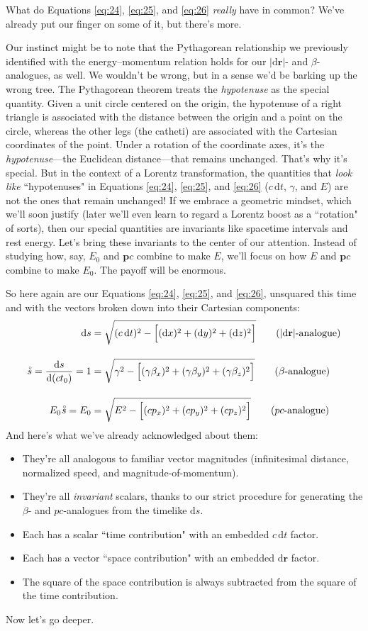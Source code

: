 \documentclass[12pt]{article}
\renewcommand{\mathring}[1]{\accentset{\circ}{#1}}
\renewcommand{\vv}[1]{\mathbf{#1}}
\newcommand{\dd}[1]{\mathrm{d}#1}
\begin{document}
What do Equations \ref{eq:24}, \ref{eq:25}, and \ref{eq:26} \emph{really} have in common? We've already put our finger on some of it, but there's more.

Our instinct might be to note that the Pythagorean relationship we previously identified with the energy--momentum relation holds for our $\vert \dd \vv r \vert$- and $\beta$-analogues, as well. We wouldn't be wrong, but in a sense we'd be barking up the wrong tree. The Pythagorean theorem treats the \emph{hypotenuse} as the special quantity. Given a unit circle centered on the origin, the hypotenuse of a right triangle is associated with the distance between the origin and a point on the circle, whereas the other legs (the catheti) are associated with the Cartesian coordinates of the point. Under a rotation of the coordinate axes, it's the \emph{hypotenuse}---the Euclidean distance---that remains unchanged. That's why it's special. But in the context of a Lorentz transformation, the quantities that \emph{look like} ``hypotenuses" in Equations \ref{eq:24}, \ref{eq:25}, and \ref{eq:26} ($c \, \dd t$, $\gamma$, and $E$) are not the ones that remain unchanged! If we embrace a geometric mindset, which we'll soon justify (later we'll even learn to regard a Lorentz boost as a ``rotation" of sorts), then our special quantities are invariants like spacetime intervals and rest energy. Let's bring these invariants to the center of our attention. Instead of studying how, say, $E_0$ and $\vv p c$ combine to make $E$, we'll focus on how $E$ and $\vv p c$ combine to make $E_0$. The payoff will be enormous.

So here again are our Equations \ref{eq:24}, \ref{eq:25}, and \ref{eq:26}, unsquared this time and with the vectors broken down into their Cartesian components:
\begin{align*}
\dd s&=\sqrt{(c \, \dd t)^2 - \Bigl[ (\dd x)^2 + (\dd y)^2 + (\dd z)^2 \Bigr]} \tag{$\vert \dd \vv r \vert$-analogue} \\[10pt]
\mathring{s} = \dfrac{\dd s}{\dd (c t_0)} =1&=\sqrt{\gamma^2 - \Bigl[ (\gamma \beta_x)^2 + (\gamma \beta_y)^2 + (\gamma \beta_z)^2 \Bigr]} \tag{$\beta$-analogue} \\[10pt]
E_0 \mkern1mu \mathring{s} = E_0 &=\sqrt{E^2 - \Bigl[ (cp_x)^2 + (cp_y)^2 + (cp_z)^2 \Bigr] } \tag{$p c$-analogue}
\end{align*}
And here's what we've already acknowledged about them:
\begin{itemize}
\item They're all analogous to familiar vector magnitudes (infinitesimal distance, normalized speed, and magnitude-of-momentum).
\item They're all \emph{invariant} scalars, thanks to our strict procedure for generating the $\beta$- and $p c$-analogues from the timelike $\dd s$.
\item Each has a scalar ``time contribution" with an embedded $c\, \dd t$ factor.
\item Each has a vector ``space contribution" with an embedded $\dd \vv r$ factor.
\item The square of the space contribution is always subtracted from the square of the time contribution.
\end{itemize}
Now let's go deeper.
\end{document}
